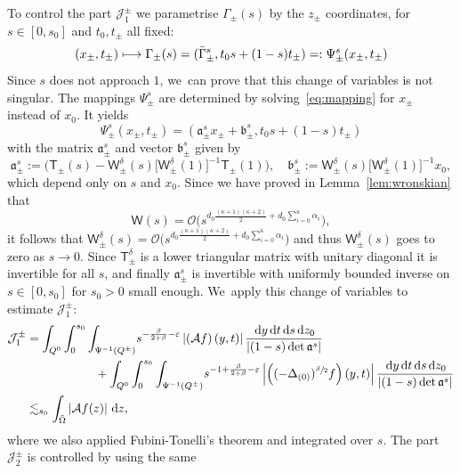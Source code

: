 \documentclass[JEP,XML,SOM,Unicode,NoFloatCountersInSection,published]{cedram}
\newcommand\mto{\mathchoice{\longmapsto}{\mapsto}{\mapsto}{\mapsto}}
\theoremstyle{definition}
\newcommand{\cA}{{\mathcal A}}
\newcommand{\cJ}{{\mathcal J}}
\newcommand{\cO}{{\mathcal O}}\let\OO\cO
\newcommand{\sW}{{\mathsf W}}
\newcommand{\sT}{{\mathsf T}}
\newcommand{\dd}{{\, \mathrm d}}
\let\var\varepsilon
\begin{document}
To control the part $\cJ^\pm_1$ we parametrise
$\Gamma_\pm(s)$ by the $z_\pm$ coordinates, for $s \in [0,s_0]$
and $t_0, t_\pm$ all fixed:
\begin{equation*}
(x_\pm,t_\pm) \mto \Gamma_\pm (s) = (\bar \Gamma^s_\pm,t_0 s +
(1-s) t_\pm) =: {\Psi^s_\pm(x_\pm,t_\pm)}
\end{equation*}
Since $s$ does not approach $1$, we~can prove that this change of
variables is not singular. The mappings $\Psi_\pm^s$ are
determined by solving~\eqref{eq:mapping} for $x_\pm$ instead of
$x_0$. It yields
\[
\Psi_\pm^s (x_\pm,t_\pm)=
(\mathfrak a_\pm^s x_\pm + \mathfrak b_\pm^s,t_0 s + (1-s) t_\pm)
\]
with the matrix $\mathfrak a_\pm^s$ and vector $\mathfrak b_\pm^s$ given
by
\begin{equation*}
\mathfrak a^s _\pm := \bigl(\sT_{\pm} (s) - \sW_\pm ^\delta (s) \big[\sW_\pm ^\delta
(1)\big]^{-1} \sT_{\pm} (1) \bigr),
\quad
\mathfrak b^s _\pm := \sW_\pm ^\delta (s) \big[\sW_\pm ^\delta
(1)\big]^{-1} x_0,
\end{equation*}
which depend only on $s$ and $x_0$. Since we have proved in
Lemma~\ref{lem:wronskian} that
\[
\sW(s) = \cO\bigl(s^{d_0
\frac{(\kappa+1)(\kappa+2)}{2}+d_0\sum_{i=0}^\kappa \alpha_i}\bigr),
\]
it follows that
$\sW^\delta_\pm(s) = \cO\bigl(s^{d_0
\frac{(\kappa+1)(\kappa+2)}{2}+d_0\sum_{i=0}^\kappa \alpha_i}\bigr)$
and thus $\sW^\delta_\pm(s)$ goes to zero as $s \to 0$. Since
$\sT^\delta_\pm$ is a lower triangular matrix with unitary
diagonal it is invertible for all $s$, and finally
$\mathfrak a^s_\pm$ is invertible with uniformly bounded inverse
on $s \in [0,s_0]$ for $s_0>0$ small enough. We~apply this change
of variables to estimate $\cJ_1^\pm$:
\begin{align*}
\cJ^\pm _1
& = \int_{Q^0} \int_0 ^{s_0} {\int_{\Psi^{-1}(Q^\pm)}} s^{-\frac{\beta}{2+\beta}-\var}
\left| \left(\cA f\right)\left(
y, t\right) \right| \frac{\dd y \dd t \dd s \dd z_0}{\left| {(1-s)} \det \mathfrak a^s \right|}\\
& \hspace*{2cm}+ \int_{Q^0} \int_0 ^{s_0} {\int_{\Psi^{-1}(Q^\pm)}} s^{-1 + \frac{\beta}{2+\beta}-\var}
\left| \left((-\Delta_{(0)})^{\sfrac{\beta}{2}} f\right)\left(
y, t\right) \right| \frac{\dd y \dd t \dd s \dd z_0}{\left|{(1-s)}
\det \mathfrak a^s \right|}\\
& \lesssim_{s_0} \int_{\tilde\Omega} \left|
\cA f(z) \right| \dd z,
\end{align*}
where we also applied Fubini-Tonelli's theorem and integrated over $s$.
The part $\cJ^\pm_2$ is controlled by using the same
\end{document}
